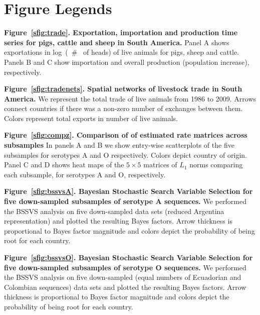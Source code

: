 \documentclass[a4paper,10pt]{article}
\begin{document}
\section*{Figure Legends}

\textbf{Figure~\ref{sfig:trade}. Exportation, importation and production time series for pigs, cattle and sheep in South America.}
Panel A shows exportations in log~(~\# ~of heads) of live animals for pigs, sheep and cattle.
Panels B and C show importation and overall production (population increase), respectively.

\textbf{Figure~\ref{sfig:tradenets}. Spatial networks of livestock trade in South America.}
We represent the total trade of live animals from 1986 to 2009.
Arrows connect countries if there was a non-zero number of exchanges between them.
Colors represent total exports in number of live animals.

\textbf{Figure~\ref{sfig:compz}. Comparison of of estimated rate matrices across subsamples}
In panels A and B we show entry-wise scatterplots of the five subsamples for serotypes A and O respectively.
Colors depict country of origin.
Panel C and D shows heat maps of the $5\times5$ matrices of $L_1$ norms comparing each subsample, for serotypes A and O, respectively.

\textbf{Figure~\ref{sfig:bssvsA}. Bayesian Stochastic Search Variable Selection for five down-sampled subsamples of serotype A sequences.}
We performed the BSSVS analysis on five down-sampled data sets (reduced Argentina representation) and plotted the resulting Bayes factors.
Arrow thickness is proportional to Bayes factor magnitude and colors depict the probability of being root for each country.

\textbf{Figure~\ref{sfig:bssvsO}. Bayesian Stochastic Search Variable Selection for five down-sampled subsamples of serotype O sequences.}
We performed the BSSVS analysis on five down-sampled (equal numbers of Ecuadorian and Colombian sequences) data sets and  plotted the resulting Bayes factors.
Arrow thickness is proportional to Bayes factor magnitude and colors depict the probability of being root for each country.
\end{document}
